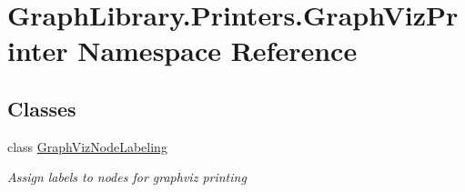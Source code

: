 \hypertarget{namespace_graph_library_1_1_printers_1_1_graph_viz_printer}{}\section{Graph\+Library.\+Printers.\+Graph\+Viz\+Printer Namespace Reference}
\label{namespace_graph_library_1_1_printers_1_1_graph_viz_printer}
\subsection*{Classes}
\begin{DoxyCompactItemize}
\item 
class \hyperlink{class_graph_library_1_1_printers_1_1_graph_viz_printer_1_1_graph_viz_node_labeling}{Graph\+Viz\+Node\+Labeling}
\begin{DoxyCompactList}\small\item\em Assign labels to nodes for graphviz printing \end{DoxyCompactList}\end{DoxyCompactItemize}
